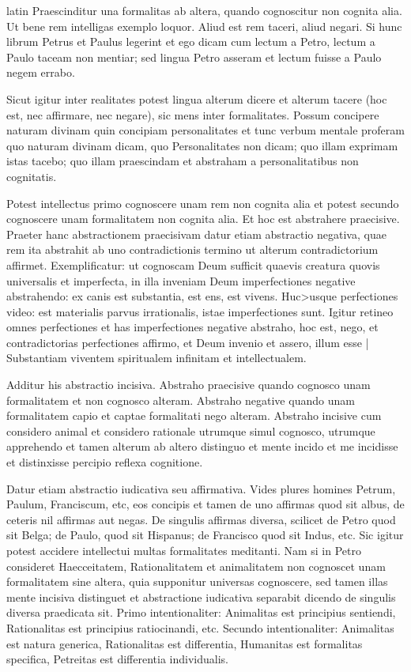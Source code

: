 \begin{otherlanguage*}{latin}
\pstart
Praescinditur una formalitas ab altera, quando cognoscitur non cognita alia. Ut bene rem intelligas exemplo loquor. Aliud est rem taceri, aliud negari. Si hunc librum Petrus et Paulus legerint et ego dicam cum lectum a Petro, lectum a Paulo taceam non mentiar; sed lingua Petro asseram et lectum fuisse a Paulo negem errabo. 
\pend

\pstart
Sicut igitur inter realitates potest lingua alterum dicere et alterum tacere (hoc est, nec affirmare, nec negare), sic mens inter formalitates. Possum concipere naturam divinam quin concipiam personalitates et tunc verbum mentale proferam quo naturam divinam dicam, quo Personalitates non dicam; quo illam exprimam istas tacebo; quo illam praescindam et abstraham a personalitatibus non cognitatis. 
\pend

\pstart
Potest intellectus primo cognoscere unam rem non cognita alia et potest secundo cognoscere unam formalitatem non cognita alia. Et hoc est abstrahere praecisive. Praeter hanc abstractionem praecisivam datur etiam abstractio negativa, quae rem ita abstrahit ab uno contradictionis termino ut alterum contradictorium affirmet. Exemplificatur:
ut cognoscam Deum sufficit quaevis creatura quovis universalis et imperfecta, in illa inveniam Deum imperfectiones negative abstrahendo:
ex canis est substantia, est ens, est vivens. Huc>usque perfectiones video:
est materialis parvus irrationalis, istae imperfectiones sunt. Igitur retineo omnes perfectiones et has imperfectiones negative abstraho, hoc est, nego, et contradictorias perfectiones affirmo, et Deum invenio et assero, illum esse \textnormal{|} Substantiam viventem spiritualem infinitam et intellectualem. 
\pend

\pstart
Additur his abstractio incisiva. Abstraho praecisive quando cognosco unam formalitatem et non cognosco alteram. Abstraho negative quando unam formalitatem capio et captae formalitati nego alteram. Abstraho incisive cum considero animal et considero rationale utrumque simul cognosco, utrumque apprehendo et tamen alterum ab altero distinguo et mente incido et me incidisse et distinxisse percipio reflexa cognitione. 
\pend

\pstart
Datur etiam abstractio iudicativa seu affirmativa. Vides plures homines Petrum, Paulum, Franciscum, etc, eos concipis et tamen de uno affirmas quod sit albus, de ceteris nil affirmas aut negas. De singulis affirmas diversa, scilicet de Petro quod sit Belga; de Paulo, quod sit Hispanus; de Francisco quod sit Indus, etc. Sic igitur potest accidere intellectui multas formalitates meditanti. Nam si in Petro consideret Haecceitatem, Rationalitatem et animalitatem non cognoscet unam formalitatem sine altera, quia supponitur universas cognoscere, sed tamen illas mente incisiva distinguet et abstractione iudicativa separabit dicendo de singulis diversa praedicata sit. Primo intentionaliter:
Animalitas est principius sentiendi, Rationalitas est principius ratiocinandi, etc. Secundo intentionaliter:
Animalitas est natura generica, Rationalitas est differentia, Humanitas est formalitas specifica, Petreitas est differentia individualis. 
\pend


\end{otherlanguage*}
